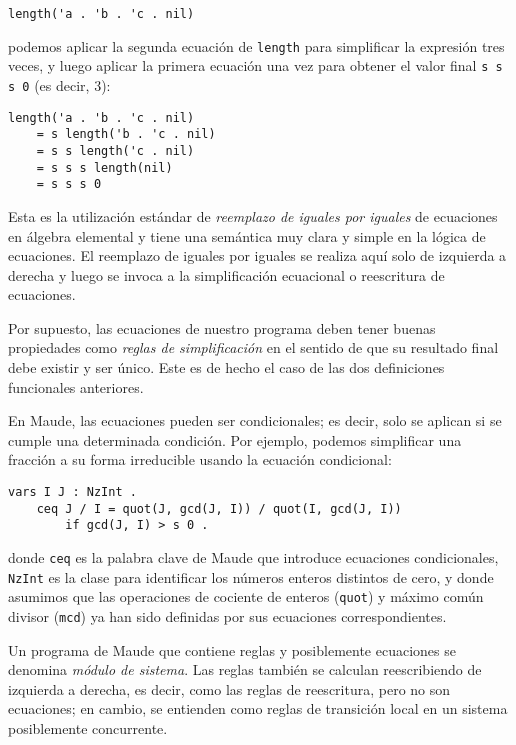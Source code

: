 \begin{lstlisting}[language=Maude]
	length('a . 'b . 'c . nil)
\end{lstlisting}
\medskip

\noindent
podemos aplicar la segunda ecuación de \texttt{length} para simplificar la expresión tres veces, y luego aplicar la primera ecuación una vez para obtener el valor final \texttt{s s s 0} (es decir, $3$):

\begin{lstlisting}[language=Maude]
	length('a . 'b . 'c . nil)
	= s length('b . 'c . nil)
	= s s length('c . nil)
	= s s s length(nil)
	= s s s 0
\end{lstlisting}
\smallskip

Esta es la utilización estándar de \textit{reemplazo de iguales por iguales} de ecuaciones en álgebra elemental y tiene una semántica muy clara y simple en la lógica de ecuaciones. El reemplazo de iguales por iguales se realiza aquí solo de izquierda a derecha y luego se invoca a la simplificación ecuacional o reescritura de ecuaciones.

Por supuesto, las ecuaciones de nuestro programa deben tener buenas propiedades como \textit{reglas de simplificación} en el sentido de que su resultado final debe existir y ser único. Este es de hecho el caso de las dos definiciones funcionales anteriores.
\medskip

En Maude, las ecuaciones pueden ser condicionales; es decir, solo se aplican si se cumple una determinada condición.
Por ejemplo, podemos simplificar una fracción a su forma irreducible usando la ecuación condicional:

\begin{lstlisting}[language=Maude]
	vars I J : NzInt .
	ceq J / I = quot(J, gcd(J, I)) / quot(I, gcd(J, I))
	    if gcd(J, I) > s 0 .
\end{lstlisting}
\medskip

\noindent
donde \texttt{ceq} es la palabra clave de Maude que introduce ecuaciones condicionales, \texttt{NzInt} es la clase para identificar los números enteros distintos de cero, y donde asumimos que las operaciones de cociente de enteros (\texttt{quot}) y máximo común divisor (\texttt{mcd}) ya han sido definidas por sus ecuaciones correspondientes.
\smallskip

Un programa de Maude que contiene reglas y posiblemente ecuaciones se denomina \textit{módulo de sistema}.
%
Las reglas también se calculan reescribiendo de izquierda a derecha, es decir, como las reglas de reescritura, pero no son ecuaciones; en cambio, se entienden como reglas de transición local en un sistema posiblemente concurrente.

